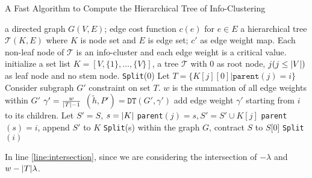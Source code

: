 \documentclass{article}
\begin{document}
\begin{algorithm}
\caption{A Fast Algorithm to Compute the Hierarchical Tree of Info-Clustering}\label{alg:psp_a}
\begin{algorithmic}[1]
\REQUIRE a directed graph $G(V, E)$; edge cost function $c(e)$ for $e\in E$
\ENSURE a hierarchical tree $\mathcal{T}(K, E)$ where $K$ is node set and $E$ is edge set; $c'$ as edge weight map. Each non-leaf node of $\mathcal{T}$ is an info-cluster and each edge weight is a critical value. 
\STATE initialize a set list $K=[V, \{1\}, \dots, \{V\}]$, a tree $\mathcal{T}$ with 0 as root node, $j(j\leq \lvert V\rvert)$ as leaf node and no stem node.
\STATE \texttt{Split}(0)
\STATE Let $T=\{K[j][0] | \texttt{parent}(j) = i\}$
\STATE Consider subgraph $G'$ constraint on set $T$. $w$ is the summation of all edge weights within $G'$ 
\STATE $\gamma' = \frac{w}{\lvert T\rvert-1}$ \label{line:intersection}  \label{alg:T}
\STATE $(\tilde{h}, P') = \texttt{DT}(G', \gamma')$
\STATE add edge weight $\gamma'$ starting from $i$ to its children. \label{alg:add_lambda}
\ELSE
{}
\STATE Let $S'=S$, $s=\lvert K\rvert$%
\STATE \texttt{parent}$(j)=s, S'=S'\cup K[j]$
\ENDIF
\ENDFOR
\STATE \texttt{parent}$(s)=i$, append $S'$ to $K$
\STATE \texttt{Split}(s)
\STATE within the graph $G$, contract $S$ to $S$[0]
\ENDFOR
\STATE \texttt{Split}$(i)$ %
\ENDIF
\ENDFUNCTION
\end{algorithmic}
\end{algorithm}
In line \ref{line:intersection}, since we are considering the intersection of $-\lambda$ and $w-\lvert T\rvert\lambda $.
\end{document}
